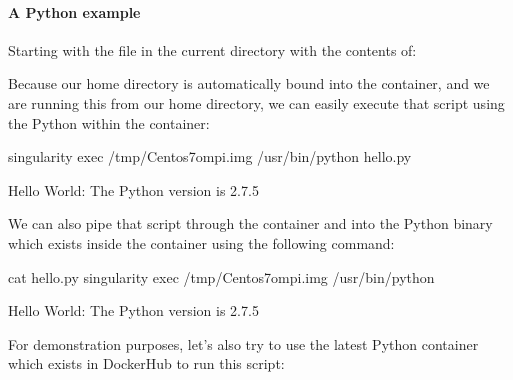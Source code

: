 \documentclass[letterpaper,10pt,english]{sphinxmanual}
\begin{document}
\paragraph{A Python example}
\label{\detokenize{appendix:a-python-example}}
Starting with the file  in the current directory with the contents of:

%
\begin{sphinxVerbatim}[commandchars=\\\{\}]


 

  \PYG{p}{[}\PYG{p}{]}
\end{sphinxVerbatim}

Because our home directory is automatically bound into the container,
and we are running this from our home directory, we can easily execute
that script using the Python within the container:

%
\begin{sphinxVerbatim}[commandchars=\\\{\}]
\PYGZdl{} singularity exec /tmp/Centos7\PYGZhy{}ompi.img /usr/bin/python hello.py

Hello World: The Python version is 2.7.5
\end{sphinxVerbatim}

We can also pipe that script through the container and into the Python
binary which exists inside the container using the following command:

%
\begin{sphinxVerbatim}[commandchars=\\\{\}]
\PYGZdl{} cat hello.py \textbar{} singularity exec /tmp/Centos7\PYGZhy{}ompi.img /usr/bin/python

Hello World: The Python version is 2.7.5
\end{sphinxVerbatim}

For demonstration purposes, let’s also try to use the latest Python
container which exists in DockerHub to run this script:
\end{document}
